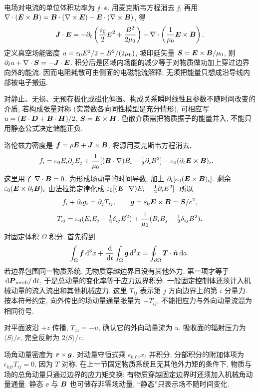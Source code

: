 电场对电流的单位体积功率为 $\jj\cdot\ee$. 用麦克斯韦方程消去 $\jj$, 再用 $\nabla\cdot(\boldsymbol{E}\times\boldsymbol{B})=\boldsymbol{B}\cdot(\nabla\times\boldsymbol{E})-\boldsymbol{E}\cdot(\nabla\times\boldsymbol{B})$, 得
\[
\boldsymbol{J}\cdot\boldsymbol{E}=-\partial_t\left(\frac{\varepsilon_0}2E^2+\frac{B^2}{2\mu_0}\right)
-\nabla\cdot\left(\frac1{\mu_0}\boldsymbol{E}\times\boldsymbol{B}\right).
\]
定义真空场能密度 $u=\varepsilon_0 E^2/2+B^2/(2\mu_0)$, 坡印廷矢量 $\boldsymbol{S}=\boldsymbol{E}\times\boldsymbol{B}/\mu_0$, 则 $\partial_tu+\nabla\cdot\boldsymbol{S}=-\boldsymbol{J}\cdot\boldsymbol{E}$. 积分后是区域内场能的减少等于对物质做功加上穿过边界向外的能流. 因而电阻耗散可由侧面的电磁能流解释, 无须把能量只想成沿导线内部被电子搬运.

对静止、无损、无预存极化或磁化偏置、构成关系瞬时线性且参数不随时间改变的介质, 若构成张量对称 (实常数各向同性模型是充分情形), 可相应写 $u=(\boldsymbol{E}\cdot\boldsymbol{D}+\boldsymbol{B}\cdot\boldsymbol{H})/2$, $\boldsymbol{S}=\boldsymbol{E}\times\boldsymbol{H}$. 色散介质需把物质振子的能量并入, 不能只用静态公式决定储能正负.

洛伦兹力密度是 $\boldsymbol{f}=\rho\boldsymbol{E}+\boldsymbol{J}\times\boldsymbol{B}$. 将源用麦克斯韦方程消去,
\begin{align*}
f_i={}&\varepsilon_0 E_i\partial_jE_j
+\frac1{\mu_0}[(\boldsymbol{B}\cdot\nabla)B_i-\tfrac12\partial_iB^2]
-\varepsilon_0(\partial_t\boldsymbol{E}\times\boldsymbol{B})_i.
\end{align*}
这里用了 $\nabla\cdot\boldsymbol{B}=0$. 为形成场动量的时间导数, 加上 $\partial_t[\varepsilon_0(\boldsymbol{E}\times\boldsymbol{B})_i]$. 剩余 $\varepsilon_0(\boldsymbol{E}\times\partial_t\boldsymbol{B})_i$ 由法拉第定律化成 $\varepsilon_0[(\boldsymbol{E}\cdot\nabla)E_i-\frac12\partial_iE^2]$. 所以
\[
f_i+\partial_tg_i=\partial_jT_{ij},\qquad
\boldsymbol{g}=\varepsilon_0\boldsymbol{E}\times\boldsymbol{B}=\boldsymbol{S}/c^2,
\]
\[
T_{ij}=\varepsilon_0(E_iE_j-\tfrac12\delta_{ij}E^2)
+\frac1{\mu_0}(B_iB_j-\tfrac12\delta_{ij}B^2).
\]
对固定体积 $\Omega$ 积分, 首先得到
\[
\int_\Omega\boldsymbol{f}\,\mathrm d^3x+\frac{\,\mathrm d}{\,\mathrm d t}\int_\Omega\boldsymbol{g}\,\mathrm d^3x
=\oint_{\partial\Omega}\boldsymbol{T}\cdot\hat{\boldsymbol{n}}\,\mathrm d a.
\]
若边界包围同一物质系统, 无物质穿越边界且没有其他外力, 第一项才等于 $\,\mathrm d\boldsymbol{P}_\mathrm{mech}/\,\mathrm d t$, 于是总动量的变化率等于应力边界积分. 一般固定控制体还须计入机械动量的流入流出和其他机械应力. 这里 $T_{ij}$ 表示第 $j$ 方向边界上的第 $i$ 分量力. 按本符号约定, 向外传出的场动量通量张量为 $-T_{ij}$, 不能把应力与外向动量流混为相同符号.

对平面波沿 $+z$ 传播, $T_{zz}=-u$, 确认它的外向动量流为 $u$. 吸收面的辐射压力为 $\langle S\rangle/c$, 完全反射为 $2\langle S\rangle/c$.

场角动量密度为 $\boldsymbol{r}\times\boldsymbol{g}$. 对动量守恒式乘 $\epsilon_{k\ell i}x_\ell$ 并积分, 分部积分的附加体项为 $\epsilon_{kji}T_{ij}=0$, 因为 $T$ 对称. 在上一节固定物质系统且无其他外力矩的条件下, 物质与场的总角动量只通过边界的应力矩交换; 有物质穿越固定边界时还须加入机械角动量通量. 静态 $\ee$ 与 $\boldsymbol{B}$ 也可储存非零场动量, “静态”只表示场不随时间变化.


